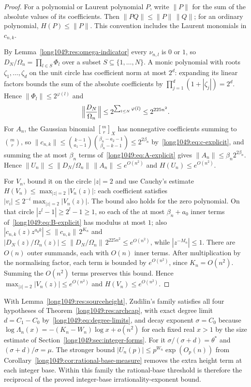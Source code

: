 \begin{proof}
For a polynomial or Laurent polynomial $P$, write $\|P\|$ for the sum
of the absolute values of its coefficients. Then
$\|PQ\|\le\|P\|\,\|Q\|$; for an ordinary polynomial,
$H(P)\le\|P\|$. This convention includes the Laurent monomials in
$c_{n,k}$.

By Lemma~\ref{long1049:res:omega-indicator} every $\nu_{n,l}$ is $0$ or $1$, so
$D_N/\Omega_n=\prod_{l\in S}\Phi_l$ over a subset $S\subseteq\{1,\dots,N\}$.
A monic polynomial with roots $\zeta_1,\ldots,\zeta_d$ on the unit circle
has coefficient norm at most $2^d$: expanding its linear factors bounds
the sum of the absolute coefficients by
$\prod_{j=1}^d(1+|\zeta_j|)=2^d$. Hence $\|\Phi_l\|\le2^{\varphi(l)}$ and
\[
 \Bigl\|\frac{D_N}{\Omega_n}\Bigr\|\le2^{\sum_{l\le N}\varphi(l)}\le2^{225n^{2}} .
\]
For $A_n$, the Gaussian binomial $\genfrac{[}{]}{0pt}{}{m}{r}_X$ has nonnegative
coefficients summing to $\binom{m}{r}$, so
$\|c_{n,k}\|\le\binom{k-1}{a_1-1}\binom{\beta_n-a_2-1}{\beta_n-k-1}\le2^{2\beta_n}$
by~\eqref{long1049:eq:c-explicit}, and summing the at most $\beta_n$ terms
of~\eqref{long1049:eq:A-explicit} gives $\|A_n\|\le\beta_n2^{2\beta_n}$.  Hence
$\|U_n\|\le\|D_N/\Omega_n\|\,\|A_n\|\le e^{O(n^{2})}$ and
$H(U_n)\le e^{O(n^{2})}$.

For $V_n$, bound it on the circle $|z|=2$ and use Cauchy's estimate
$H(V_n)\le\max_{|z|=2}|V_n(z)|$: each coefficient satisfies
$|v_i|\le2^{-i}\max_{|z|=2}|V_n(z)|$. The bound also holds for the
zero polynomial.  On that circle
$|z^{l}-1|\ge2^{l}-1\ge1$, so each of the at most $\beta_n+a_0$ inner terms
of~\eqref{long1049:eq:B-explicit} has modulus at most $1$; also
$|c_{n,k}(z)z^{a_0k}|\le\|c_{n,k}\|\,2^{K_n}$ and
$|D_N(z)/\Omega_n(z)|\le\|D_N/\Omega_n\|\,2^{225n^{2}}\le e^{O(n^{2})}$, while
$|z^{-M_n}|\le1$. There are $O(n)$ outer summands, each with $O(n)$
inner terms. After multiplication by the normalising factor, each
term is bounded by $e^{O(n^2)}$, since $K_n=O(n^2)$. Summing the
$O(n^2)$ terms preserves this bound. Hence
$\max_{|z|=2}|V_n(z)|\le e^{O(n^2)}$ and $H(V_n)\le e^{O(n^2)}$.
\end{proof}

\noindent With Lemma~\ref{long1049:res:sourceheight}, Zudilin's family satisfies all four
hypotheses of Theorem~\ref{long1049:res:archcap}, with exact degree limit $d=C_1-C_0$
by~\eqref{long1049:eq:degree-limits}, and decay exponent $\sigma=C_0$ because
$\log\Lambda_n(x)=-(K_n-W_n)\log x+o(n^{2})$ for each fixed real $x>1$ by the
size estimate of Section~\ref{long1049:sec:integer-forms}.  For it $\sigma/(\sigma+d)=\theta^{*}$ and
$(\sigma+d)/\sigma=\mu$. The stronger bound
$|U_n(p)|\le p^{W_n}\exp(O_p(n))$ from
Corollary~\ref{long1049:cor:rational-base-measure} removes the extra height
term at each integer base. Within this family the rational-base
threshold is therefore the reciprocal of the proved integer-base
irrationality-exponent bound.

